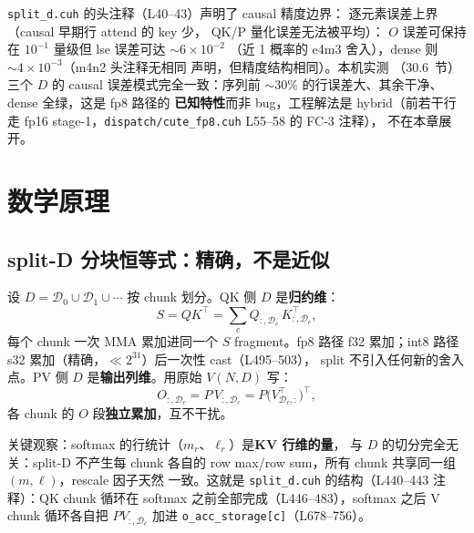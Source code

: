 \texttt{split\_d.cuh} 的头注释（L40--43）声明了 causal 精度边界：
逐元素误差上界（causal 早期行 attend 的 key 少，
QK/P 量化误差无法被平均）：
$O$ 误差可保持在 $10^{-1}$ 量级但 lse 误差可达 $\sim 6\times10^{-2}$
（近 1 概率的 e4m3 舍入），dense 则 $\sim 4\times10^{-3}$（m4n2 头注释无相同
声明，但精度结构相同）。本机实测
（30.6~节）三个 $D$ 的 causal 误差模式完全一致：序列前
$\sim$30\% 的行误差大、其余干净、dense 全绿，这是 fp8 路径的
\textbf{已知特性}而非 bug，工程解法是 hybrid（前若干行走 fp16
stage-1，\texttt{dispatch/cute\_fp8.cuh} L55--58 的 FC-3 注释），
不在本章展开。

\section{数学原理}

\subsection{split-D 分块恒等式：精确，不是近似}\label{sec:30-identity}

设 $D=\mathcal{D}_0\cup\mathcal{D}_1\cup\cdots$ 按 chunk 划分。QK 侧
$D$ 是\textbf{归约维}：
\begin{equation}\label{eq:30-qk-split}
S=QK^{\top}=\sum_{c}Q_{:,\mathcal{D}_c}\,K^{\top}_{:,\mathcal{D}_c},
\end{equation}
每个 chunk 一次 MMA 累加进同一个 $S$ fragment。fp8 路径 f32
累加；int8 路径 s32 累加（精确，$\ll 2^{31}$）后一次性 cast（L495--503），
split 不引入任何新的舍入点。PV 侧 $D$ 是\textbf{输出列维}。用原始 $V(N,D)$ 写：
\begin{equation}\label{eq:30-pv-split}
O_{:,\mathcal{D}_c}=P\,V_{:,\mathcal{D}_c}
 =P\bigl(V^{\top}_{\mathcal{D}_c,:}\bigr)^{\top},
\end{equation}
各 chunk 的 $O$ 段\textbf{独立累加}，互不干扰。

关键观察：softmax 的行统计（$m_r$、$\ell_r$）是\textbf{KV 行维的量}，
与 $D$ 的切分完全无关：split-D 不产生每 chunk 各自的
row max/row sum，所有 chunk 共享同一组 $(m,\ell)$，rescale 因子天然
一致。这就是 \texttt{split\_d.cuh} 的结构（L440--443 注释）：QK chunk
循环在 softmax 之前全部完成（L446--483），softmax 之后 V
chunk 循环各自把 $P V_{:,\mathcal{D}_c}$ 加进
\texttt{o\_acc\_storage[c]}（L678--756）。

